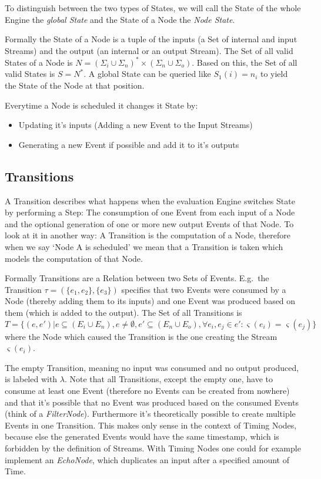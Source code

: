 To distinguish between the two types of States, we will call the State of the whole Engine the \emph{global State} and the State of a Node the \emph{Node State}.

Formally the State of a Node is a tuple of the inputs (a Set of internal and input Streams) and the output (an internal or an output Stream).
The Set of all valid States of a Node is \(N = {(\Sigma_i \cup \Sigma_n)}^*\times(\Sigma_n \cup \Sigma_o)\).
Based on this, the Set of all valid States is \(S = N^*\).
A global State can be queried like \(S_1(i) = n_i\) to yield the State of the Node at that position.

Everytime a Node is scheduled it changes it State by:

\begin{itemize}
  \item Updating it's inputs (Adding a new Event to the Input Streams)
  \item Generating a new Event if possible and add it to it's outputs
\end{itemize}

\subsection{Transitions}
\label{sec:concepts:def:transitions}

A Transition describes what happens when the evaluation Engine switches State by performing a Step:
The consumption of one Event from each input of a Node and the optional generation of one or more new output Events of that Node.
To look at it in another way: A Transition is the computation of a Node, therefore when we say `Node A is scheduled' we mean that a Transition is taken which models the computation of that Node.

Formally Transitions are a Relation between two Sets of Events.
E.g.\ the Transition \(\tau = (\{e_1,e_2\}, \{e_3\})\) specifies that two Events were consumed by a Node (thereby adding them to its inputs) and one Event was produced based on them (which is added to the output).
The Set of all Transitions is
\[
  T = \{(e, e') | e \subseteq (E_i \cup E_n),e \neq \emptyset, e' \subseteq (E_n \cup E_o), \forall e_i, e_j \in e': \varsigma(e_i) = \varsigma(e_j)\}
\]
where the Node which caused the Transition is the one creating the Stream \(\varsigma(e_i)\).

The empty Transition, meaning no input was consumed and no output produced, is labeled with \(\lambda\).
Note that all Transitions, except the empty one, have to consume at least one Event (therefore no Events can be created from nowhere) and that it's possible that no Event was produced based on the consumed Events (think of a \emph{FilterNode}).
Furthermore it's theoretically possible to create multiple Events in one Transition.
This makes only sense in the context of Timing Nodes, because else the generated Events would have the same timestamp, which is forbidden by the definition of Streams.
With Timing Nodes one could for example implement an \emph{EchoNode}, which duplicates an input after a specified amount of Time.


